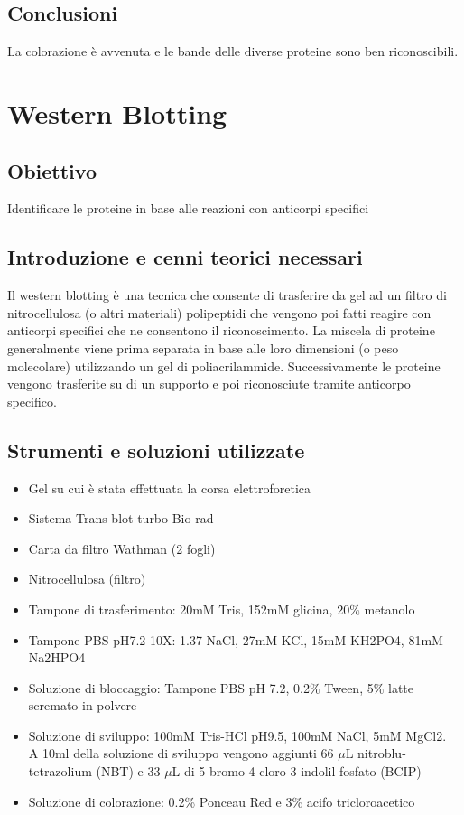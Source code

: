 \documentclass{extarticle}
\begin{document}
\subsection*{Conclusioni}
La colorazione è avvenuta e le bande delle diverse proteine sono ben riconoscibili.\\

\newpage
\section{Western Blotting}
\subsection*{Obiettivo}
Identificare le proteine in base alle reazioni con anticorpi specifici
\subsection*{Introduzione e cenni teorici necessari}
Il western blotting è una tecnica che consente di trasferire da gel ad un filtro di nitrocellulosa (o altri materiali) polipeptidi che vengono poi fatti reagire con anticorpi specifici che ne consentono il riconoscimento.
La miscela di proteine generalmente viene prima separata in base alle loro dimensioni (o peso molecolare) utilizzando un gel di poliacrilammide. Successivamente le proteine vengono
trasferite su di un supporto e poi riconosciute tramite anticorpo specifico.\\

\subsection*{Strumenti e soluzioni utilizzate}
\begin{itemize}
    \item Gel su cui è stata effettuata la corsa elettroforetica
    \item Sistema Trans-blot turbo Bio-rad
    \item Carta da filtro Wathman (2 fogli)
    \item Nitrocellulosa (filtro)
    \item Tampone di trasferimento: 20mM  Tris, 152mM glicina, 20$\%$ metanolo
    \item Tampone PBS pH7.2 10X: 1.37 NaCl, 27mM KCl, 15mM KH2PO4, 81mM Na2HPO4
    \item Soluzione di bloccaggio: Tampone PBS pH 7.2, 0.2$\%$ Tween, 5$\%$ latte scremato in polvere
    \item Soluzione di sviluppo: 100mM Tris-HCl pH9.5, 100mM NaCl, 5mM MgCl2.\\
    A 10ml della soluzione di sviluppo vengono aggiunti 66 $\mu$L nitroblu- tetrazolium (NBT) e 33 $\mu$L di 5-bromo-4 cloro-3-indolil fosfato (BCIP)       
    \item Soluzione di colorazione: 0.2\% Ponceau Red e 3\% acifo tricloroacetico
\end{itemize}
\end{document}

